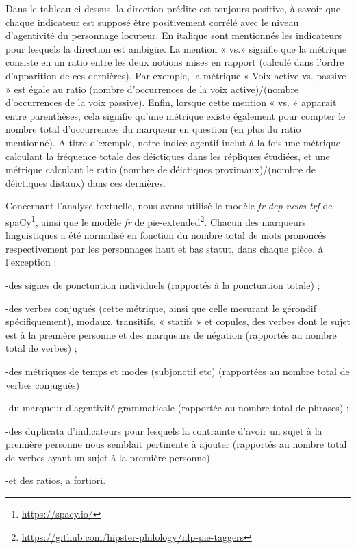 Dans le tableau ci-dessus, la direction prédite est toujours positive, à savoir que chaque indicateur est supposé être positivement corrélé avec le niveau d’agentivité du personnage locuteur. En italique sont mentionnés les indicateurs pour lesquels la direction est ambigüe. La mention « vs.» signifie que la métrique consiste en un ratio entre les deux notions mises en rapport (calculé dans l'ordre d'apparition de ces dernières). Par exemple, la métrique « Voix active vs. passive » est égale au ratio (nombre d'occurrences de la voix active)/(nombre d'occurrences de la voix passive). Enfin, lorsque cette mention « vs. » apparait entre parenthèses, cela signifie qu'une métrique existe également pour compter le nombre total d'occurrences du marqueur en question (en plus du ratio mentionné). A titre d'exemple, notre indice agentif inclut à la fois une métrique calculant la fréquence totale des déictiques dans les répliques étudiées, et une métrique calculant le ratio (nombre de déictiques proximaux)/(nombre de déictiques distaux) dans ces dernières.

Concernant l’analyse textuelle, nous avons utilisé le modèle \textit{fr-dep-news-trf} de spaCy\footnote{\url{https://spacy.io/}}, ainsi que le modèle \textit{fr} de pie-extended\footnote{\url{https://github.com/hipster-philology/nlp-pie-taggers}}. Chacun des marqueurs linguistiques a été normalisé en fonction du nombre total de mots prononcés respectivement par les personnages haut et bas statut, dans chaque pièce, à l'exception : 

-des signes de ponctuation individuels (rapportés à la ponctuation totale) ; 

-des verbes conjugués (cette métrique, ainsi que celle mesurant le gérondif spécifiquement), modaux, transitifs, « statifs » et copules, des verbes dont le sujet est à la première personne et des marqueurs de négation (rapportés au nombre total de verbes) ; 

-des métriques de temps et modes (subjonctif etc) (rapportées au nombre total de verbes conjugués)

-du marqueur d’agentivité grammaticale (rapportée au nombre total de phrases) ;

-des duplicata d’indicateurs pour lesquels la contrainte d’avoir un sujet à la première personne nous semblait pertinente à ajouter (rapportés au nombre total de verbes ayant un sujet à la première personne) 

-et des ratios, a fortiori.
